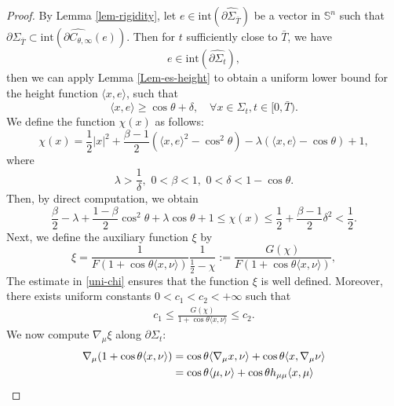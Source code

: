 \documentclass[10pt,a4paper]{amsart}
\begin{document}
\begin{proof}
By Lemma \ref{lem-rigidity}, let $e\in \mathrm{int}(\widehat{\partial\Sigma_{\bar{T}}})$ be a vector in $\mathbb{S}^{n}$ such that $\partial\Sigma_{\bar{T}}\subset\mathrm{int}(\widehat{\partial C_{\theta,\infty}}(e))$. Then for $t$ sufficiently close to $\bar{T}$, we have
\begin{equation*}
	e\in \mathrm{int}(\widehat{\partial\Sigma_{{t}}}),
\end{equation*}
then we can apply Lemma \ref{Lem-es-height} to obtain a uniform lower bound for the height function $\langle x,e\rangle$, such that 
\begin{equation}\label{lower-height}
	\langle x,e\rangle\geq \cos\theta+\delta,\quad \forall x\in\Sigma_t,t\in[0,\bar{T}).
\end{equation}
We define the function $\chi(x)$ as follows:
\begin{equation}
	\chi(x)=\frac{1}{2}|x|^2+\frac{\beta-1}{2}(\langle x,e\rangle^2-\cos^2{\theta})-\lambda(\langle x,e\rangle-\cos\theta)+1,
\end{equation}
where 
\begin{equation*}
	\lambda>\frac{1}{\delta},\,\,0<\beta<1,\,\,0<\delta<1-\cos\theta.
\end{equation*}
Then, by direct computation, we obtain
\begin{equation}\label{uni-chi}
	\frac{\beta}{2}-\lambda+\frac{1-\beta}{2}\cos^2{\theta}+\lambda\cos\theta+1\leq \chi(x)\leq \frac{1}{2}+\frac{\beta-1}{2}\delta^2< \frac{1}{2}.
\end{equation}
Next, we define the auxiliary function $\xi$ by
\begin{equation}
	\xi=\frac{1}{F(1+\cos\theta\langle x,\nu \rangle)}\frac{1}{\frac{1}{2}-\chi}:=\frac{G(\chi)}{F(1+\cos\theta\langle x,\nu \rangle)},
\end{equation}
The estimate in \eqref{uni-chi} ensures that the function $\xi$ is well defined. Moreover,  there exists uniform constants $0<c_1<c_2<+\infty$ such that 
\begin{align}\label{uni-G}
c_1\leq	\frac{G(\chi)}{1+\cos\theta\langle x,\nu \rangle}\leq c_2.
\end{align}
We now compute $\nabla_{\mu}{\xi}$ along $\partial\Sigma_t$:
\begin{align}
	\nabla_{\mu}(1+\cos\theta\langle x,\nu \rangle)&=\cos\theta\langle\nabla_{\mu}{x},\nu \rangle+\cos\theta\langle x,\nabla_{\mu}{\nu}\rangle\notag\\
	&=\cos\theta\langle \mu,\nu\rangle+\cos\theta h_{\mu\mu}\langle x,\mu \rangle\notag\\

\end{align}
\end{proof}
\end{document}
